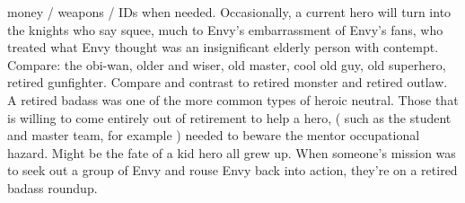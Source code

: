 \documentclass[12pt]{book}
\begin{document}
money / weapons / IDs when needed. Occasionally, a current hero will turn into the knights who say squee, much to Envy's embarrassment of Envy's fans, who treated what Envy thought was an insignificant elderly person with contempt. Compare: the obi-wan, older and wiser, old master, cool old guy, old superhero, retired gunfighter. Compare and contrast to retired monster and retired outlaw. A retired badass was one of the more common types of heroic neutral. Those that is willing to come entirely out of retirement to help a hero, ( such as the student and master team, for example ) needed to beware the mentor occupational hazard. Might be the fate of a kid hero all grew up. When someone's mission was to seek out a group of Envy and rouse Envy back into action, they're on a retired badass roundup.
\end{document}
